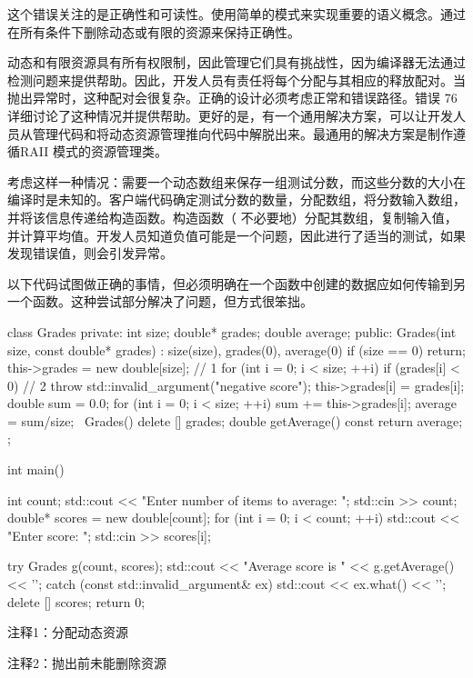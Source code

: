 这个错误关注的是正确性和可读性。使用简单的模式来实现重要的语义概念。通过在所有条件下删除动态或有限的资源来保持正确性。

动态和有限资源具有所有权限制，因此管理它们具有挑战性，因为编译器无法通过检测问题来提供帮助。因此，开发人员有责任将每个分配与其相应的释放配对。当抛出异常时，这种配对会很复杂。正确的设计必须考虑正常和错误路径。错误 76 详细讨论了这种情况并提供帮助。更好的是，有一个通用解决方案，可以让开发人员从管理代码和将动态资源管理推向代码中解脱出来。最通用的解决方案是制作遵循RAII 模式的资源管理类。


考虑这样一种情况：需要一个动态数组来保存一组测试分数，而这些分数的大小在编译时是未知的。客户端代码确定测试分数的数量，分配数组，将分数输入数组，并将该信息传递给构造函数。构造函数（ 不必要地）分配其数组，复制输入值，并计算平均值。开发人员知道负值可能是一个问题，因此进行了适当的测试，如果发现错误值，则会引发异常。

以下代码试图做正确的事情，但必须明确在一个函数中创建的数据应如何传输到另一个函数。这种尝试部分解决了问题，但方式很笨拙。


\begin{cpp}
class Grades {
private:
  int size;
  double* grades;
  double average;
public:
  Grades(int size, const double* grades) : size(size), grades(0),
         average(0) {
    if (size == 0)
      return;
    this->grades = new double[size]; // 1
    for (int i = 0; i < size; ++i) {
      if (grades[i] < 0) // 2
      throw std::invalid_argument("negative score");
      this->grades[i] = grades[i];
    }
    double sum = 0.0;
    for (int i = 0; i < size; ++i)
      sum += this->grades[i];
    average = sum/size;
  }
  ~Grades() { delete [] grades; }
  double getAverage() const { return average; }
};

int main() {
  int count;
  std::cout << "Enter number of items to average: ";
  std::cin >> count;
  double* scores = new double[count];
  for (int i = 0; i < count; ++i) {
    std::cout << "Enter score: ";
    std::cin >> scores[i];
  }

  try {
    Grades g(count, scores);
    std::cout << "Average score is " << g.getAverage() << '\n';
  } catch (const std::invalid_argument& ex) {
    std::cout << ex.what() << '\n';
  }
  delete [] scores;
  return 0;
}
\end{cpp}

{\footnotesize
注释1：分配动态资源

注释2：抛出前未能删除资源
}

